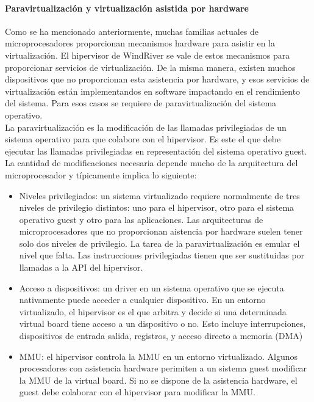 \paragraph{Paravirtualización y virtualización asistida por hardware}
Como se ha mencionado anteriormente, muchas familias actuales de microprocesadores proporcionan mecanismos hardware para asistir en la virtualización. El hipervisor de WindRiver se vale de estos mecanismos para proporcionar servicios de virtualización. De la misma manera, existen muchos dispositivos que no proporcionan esta asistencia por hardware, y esos servicios de virtualización están implementandos en software impactando en el rendimiento del sistema. Para esos casos se requiere de paravirtualización del sistema operativo.\\
La paravirtualización es la modificación de las llamadas privilegiadas de un sistema operativo para que colabore con el hipervisor. Es este el que debe ejecutar las llamadas privilegiadas en representación del sistema operativo guest. La cantidad de modificaciones necesaria depende mucho de la arquitectura del microprocesador y típicamente implica lo siguiente:

\begin{itemize}
  \item Niveles privilegiados: un sistema virtualizado requiere normalmente de tres niveles de privilegio distintos: uno para el hipervisor, otro para el sistema operativo guest y otro para las aplicaciones. Las arquitecturas de microprocesadores que no proporcionan aistencia por hardware suelen tener solo dos niveles de privilegio. La tarea de la paravirtualización es emular el nivel que falta. Las instrucciones privilegiadas tienen que ser sustituidas por llamadas a la API del hipervisor.
  \item Acceso a dispositivos: un driver en un sistema operativo que se ejecuta nativamente puede acceder a cualquier dispositivo. En un entorno virtualizado, el hipervisor es el que arbitra y decide si una determinada virtual board tiene acceso a un dispositivo o no. Esto incluye interrupciones, dispositivos de entrada salida, registros, y acceso directo a memoria (DMA)
  \item MMU: el hipervisor controla la MMU en un entorno virtualizado. Algunos procesadores con asistencia hardware perimiten a un sistema guest modificar la MMU de la virtual board. Si no se dispone de la asistencia hardware, el guest debe colaborar con el hipervisor para modificar la MMU.
\end{itemize}

